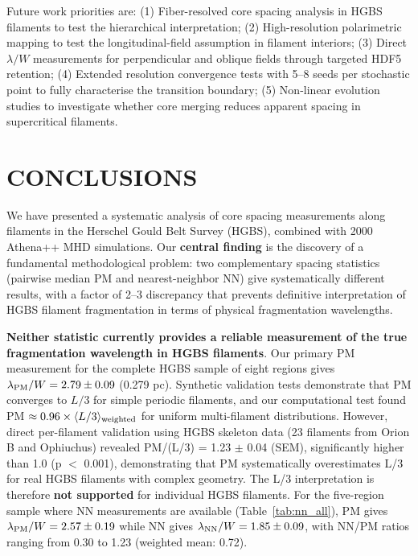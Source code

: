 \documentclass[twoside,twocolumn]{mnras}
\begin{document}
Future work priorities are: (1) Fiber-resolved core spacing analysis in HGBS filaments to test the hierarchical interpretation; (2) High-resolution polarimetric mapping to test the longitudinal-field assumption in filament interiors; (3) Direct $\lambda/W$ measurements for perpendicular and oblique fields through targeted HDF5 retention; (4) Extended resolution convergence tests with 5--8 seeds per stochastic point to fully characterise the transition boundary; (5) Non-linear evolution studies to investigate whether core merging reduces apparent spacing in supercritical filaments.

\section{CONCLUSIONS}

We have presented a systematic analysis of core spacing measurements along filaments in the Herschel Gould Belt Survey (HGBS), combined with 2000 Athena++ MHD simulations. Our \textbf{central finding} is the discovery of a fundamental methodological problem: two complementary spacing statistics (pairwise median PM and nearest-neighbor NN) give systematically different results, with a factor of 2--3 discrepancy that prevents definitive interpretation of HGBS filament fragmentation in terms of physical fragmentation wavelengths.

\textbf{Neither statistic currently provides a reliable measurement of the true fragmentation wavelength in HGBS filaments}. Our primary PM measurement for the complete HGBS sample of eight regions gives $\lambda_{\rm PM}/W = 2.79 \pm 0.09$ (0.279 pc). Synthetic validation tests demonstrate that PM converges to $L/3$ for simple periodic filaments, and our computational test found PM $\approx 0.96 \times \langle L/3 \rangle_{\rm weighted}$ for uniform multi-filament distributions. However, direct per-filament validation using HGBS skeleton data (23 filaments from Orion B and Ophiuchus) revealed PM/(L/3) = 1.23 $\pm$ 0.04 (SEM), significantly higher than 1.0 (p $<$ 0.001), demonstrating that PM systematically overestimates L/3 for real HGBS filaments with complex geometry. The L/3 interpretation is therefore \textbf{not supported} for individual HGBS filaments. For the five-region sample where NN measurements are available (Table~\ref{tab:nn_all}), PM gives $\lambda_{\rm PM}/W = 2.57 \pm 0.19$ while NN gives $\lambda_{\rm NN}/W = 1.85 \pm 0.09$, with NN/PM ratios ranging from 0.30 to 1.23 (weighted mean: 0.72).
\end{document}

